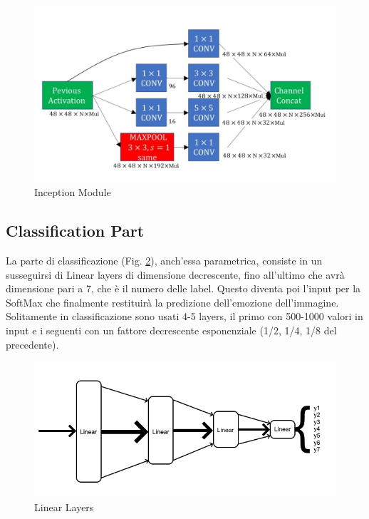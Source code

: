 \documentclass[target=mst]{thud}
\begin{document}
\begin{figure}[h!] 
  \centering
  \includegraphics[scale=0.45]{inception.png}
  \caption{Inception Module}
  \label{fig:Inception}
\end{figure}
\vfill

\subsection{Classification Part}
La parte di classificazione (Fig. \ref{fig:linear}), anch'essa parametrica, consiste in un susseguirsi di Linear layers di dimensione decrescente, fino all'ultimo che avrà dimensione pari a 7, che è il numero delle label. 
Questo diventa poi l'input per la SoftMax che finalmente restituirà la predizione dell'emozione dell'immagine.
Solitamente in classificazione sono usati 4-5 layers, il primo con 500-1000 valori in input e i seguenti con un fattore decrescente esponenziale (1/2, 1/4, 1/8 del precedente).

\begin{figure}[h!]
  \centering
  \includegraphics[scale=0.75]{SequenceOfLinear.png}
  \caption{Linear Layers}
  \label{fig:linear}
\end{figure}
\end{document}
